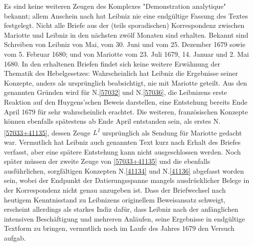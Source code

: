 \begin{ledgroup}
Es sind keine weiteren Zeugen des Komplexes "Demonstration analytique" bekannt; allem Anschein nach hat Leibniz nie  eine endgültige Fassung des Textes festgelegt.
\pend
\pstart
Nicht alle Briefe aus der (teils sporadischen) Korrespondenz zwischen Mariotte und Leibniz in den nächsten zwölf Monaten sind erhalten. 
Bekannt sind Schreiben von 
Leibniz \cite{02174}von Mai, \cite{02175}vom 30. Juni und \cite{02177}vom 25. Dezember 1679 sowie \cite{02179}vom 5. Februar 1680; und von
Mariotte \cite{02176}vom 23. Juli 1679, \cite{02178}14. Januar und \cite{02180}2. Mai 1680.
In den erhaltenen Briefen findet sich keine weitere Erwähnung der Thematik des Hebelgesetzes: Wahrscheinlich hat Leibniz die Ergebnisse seiner Konzepte, anders als ursprünglich beabsichtigt, nie mit Mariotte geteilt.
\pend
\pstart
Aus den genannten Gründen wird für 
N.\;\ref{57032} und N.\;\ref{57036}, die Leibnizens erste Reaktion auf den Huygens'schen Beweis darstellen,
eine Entstehung bereits Ende April 1679 für sehr wahrscheinlich erachtet.
Die weiteren, französischen Konzepte können ebenfalls spätestens ab Ende April entstanden sein, als erstes N.\;\ref{57033+41135}, dessen Zeuge \textit{L\textsuperscript{1}} ursprünglich als Sendung für Mariotte gedacht war. Vermutlich hat Leibniz auch genannten Text kurz nach Erhalt des Briefes verfasst, aber eine spätere Entstehung kann nicht ausgeschlossen werden. 
Noch später müssen der zweite Zeuge von \ref{57033+41135} und die ebenfalls ausführlichen, sorgfältigen Konzepten N.\;\ref{41134} und N.\;\ref{41136} abgefasst worden sein, wobei der Endpunkt der Datierungsspanne mangels ausdrücklicher Belege in der Korrespondenz nicht genau anzugeben ist.
Dass der Briefwechsel nach heutigem Kenntnisstand zu Leibnizens originellem Beweisansatz schweigt, erscheint allerdings als starkes Indiz dafür, dass Leibniz nach der anfänglichen intensiven Beschäftigung und mehreren Anläufen, seine Ergebnisse in endgültige Textform zu bringen, vermutlich noch im Laufe des Jahres 1679 den Versuch aufgab.
\pend
\end{ledgroup}
